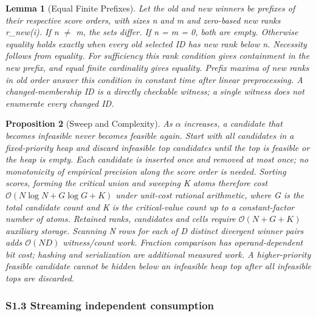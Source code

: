 \documentclass[11pt,a4paper]{article}
\theoremstyle{plain}
\newtheorem{proposition}{Proposition}
\newtheorem{lemma}[proposition]{Lemma}
\theoremstyle{definition}
\theoremstyle{remark}
\begin{document}
\begin{lemma}[Equal Finite Prefixes]\label{lem:s2}
Let the old and new winners be prefixes of their respective score orders, with sizes n and m and zero-based new ranks r\_new(i). If n $\neq$ m, the sets differ. If n = m = 0, both are empty. Otherwise equality holds exactly when every old selected ID has new rank below n. Necessity follows from equality. For sufficiency this rank condition gives containment in the new prefix, and equal finite cardinality gives equality. Prefix maxima of new ranks in old order answer this condition in constant time after linear preprocessing. A changed-membership ID is a directly checkable witness; a single witness does not enumerate every changed ID.
\end{lemma}
\begin{proposition}[Sweep and Complexity]\label{prop:s3}
As $\alpha$ increases, a candidate that becomes infeasible never becomes feasible again. Start with all candidates in a fixed-priority heap and discard infeasible top candidates until the top is feasible or the heap is empty. Each candidate is inserted once and removed at most once; no monotonicity of empirical precision along the score order is needed. Sorting scores, forming the critical union and sweeping K atoms therefore cost $\mathcal{O}(N \log N + G \log G + K)$ under unit-cost rational arithmetic, where G is the total candidate count and K is the critical-value count up to a constant-factor number of atoms. Retained ranks, candidates and cells require $\mathcal{O}(N + G + K)$ auxiliary storage. Scanning N rows for each of D distinct divergent winner pairs adds $\mathcal{O}(ND)$ witness/count work. Fraction comparison has operand-dependent bit cost; hashing and serialization are additional measured work. A higher-priority feasible candidate cannot be hidden below an infeasible heap top after all infeasible tops are discarded.
\end{proposition}

\subsubsection*{S1.3 Streaming independent consumption}\label{sec:s1_3}
\end{document}
